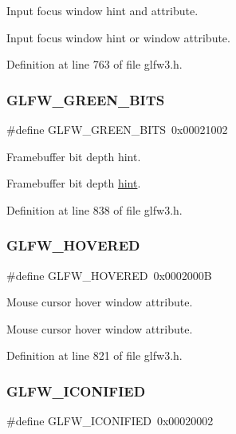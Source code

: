Input focus window hint and attribute. 

Input focus window hint or window attribute. 

Definition at line 763 of file glfw3.\+h.

\mbox{\label{group__window_gafba3b72638c914e5fb8a237dd4c50d4d}} 
\subsubsection{\texorpdfstring{GLFW\_GREEN\_BITS}{GLFW\_GREEN\_BITS}}
{\footnotesize\ttfamily \#define G\+L\+F\+W\+\_\+\+G\+R\+E\+E\+N\+\_\+\+B\+I\+TS~0x00021002}



Framebuffer bit depth hint. 

Framebuffer bit depth \mbox{\hyperlink{group__window_gafba3b72638c914e5fb8a237dd4c50d4d}{hint}}. 

Definition at line 838 of file glfw3.\+h.

\mbox{\label{group__window_ga8665c71c6fa3d22425c6a0e8a3f89d8a}} 
\subsubsection{\texorpdfstring{GLFW\_HOVERED}{GLFW\_HOVERED}}
{\footnotesize\ttfamily \#define G\+L\+F\+W\+\_\+\+H\+O\+V\+E\+R\+ED~0x0002000B}



Mouse cursor hover window attribute. 

Mouse cursor hover window attribute. 

Definition at line 821 of file glfw3.\+h.

\mbox{\label{group__window_ga39d44b7c056e55e581355a92d240b58a}} 
\subsubsection{\texorpdfstring{GLFW\_ICONIFIED}{GLFW\_ICONIFIED}}
{\footnotesize\ttfamily \#define G\+L\+F\+W\+\_\+\+I\+C\+O\+N\+I\+F\+I\+ED~0x00020002}



